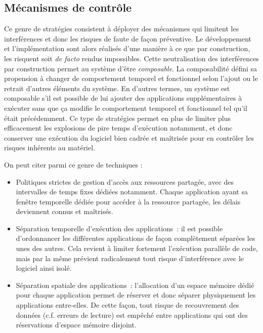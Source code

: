 \documentclass[french, a4paper, 11pt, twoside, pdftex]{StyleThese}
\begin{document}
	\subsection{Mécanismes de contrôle}
		Ce genre de stratégies consistent à déployer des mécanismes qui limitent les interférences et donc les risques de faute de façon préventive. Le développement et l'implémentation sont alors réalisés d'une manière à ce que par construction, les risquent soit \textit{de facto} rendus impossibles. Cette neutralisation des interférences par construction permet au système d'être \textit{composable}. La composabilité défini sa propension à changer de comportement temporel et fonctionnel selon l'ajout ou le retrait d'autres éléments du système. En d'autres termes, un système est composable s'il est possible de lui ajouter des applications supplémentaires à exécuter sans que ça modifie le comportement temporel et fonctionnel tel qu'il était précédemment. 
		Ce type de stratégies permet en plus de limiter plus efficacement les explosions de pire temps d'exécution notamment, et donc conserver une exécution du logiciel bien cadrée et maîtrisée pour en contrôler les risques inhérents au matériel. 
		
		On peut citer parmi ce genre de techniques : 
		\begin{itemize}
			\item 			Politiques strictes de gestion d'accès aux ressources partagée, avec des intervalles de temps fixes dédiées notamment. Chaque application ayant sa fenêtre temporelle dédiée pour accéder à la ressource partagée, les délais deviennent connus et maîtrisés.
			\item 			Séparation temporelle d'exécution des applications~: il est possible d'ordonnancer les différentes applications de façon complètement séparées les unes des autres. Cela revient à limiter fortement l'exécution parallèle de code, mais par la même prévient radicalement tout risque d'interférence avec le logiciel ainsi isolé.
			\item 			Séparation spatiale des applications~: l'allocation d'un espace mémoire dédié pour chaque application permet de réserver et donc séparer physiquement les applications entre-elles. De cette façon, tout risque de recouvrement des données (c.f. erreurs de lecture) est empêché entre applications qui ont des réservations d'espace mémoire disjoint.
		\end{itemize}
		
\end{document}
